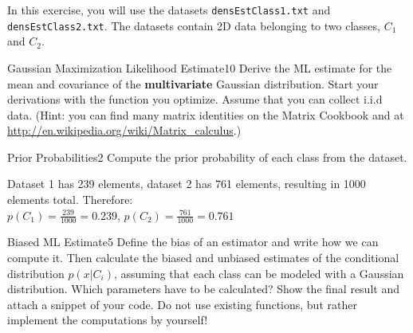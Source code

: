 \newif\ifvimbug
\vimbugfalse

\ifvimbug

\fi

In this exercise, you will use the datasets \texttt{densEstClass1.txt} 
and \texttt{densEstClass2.txt}. The datasets contain 2D data belonging
to two classes, $C_1$ and $C_2$.

\begin{questions}


\begin{question}{Gaussian Maximization Likelihood Estimate}{10}
Derive the ML estimate for the mean and covariance of the \textbf{multivariate} Gaussian distribution. Start your derivations with the function you optimize. Assume that you can collect i.i.d data. (Hint: you can find many matrix identities on the Matrix Cookbook and at \url{http://en.wikipedia.org/wiki/Matrix_calculus}.)

\begin{answer}

\end{answer}

\end{question}



\begin{question}{Prior Probabilities}{2}
Compute the prior probability of each class from the dataset. 

\begin{answer}
Dataset 1 has 239 elements, dataset 2 has 761 elements, resulting in 1000 elements total. Therefore:\\
$p(C_1) = \frac{239}{1000}=0.239$, $p(C_2) = \frac{761}{1000}=0.761$
\end{answer}

\end{question}



\begin{question}{Biased ML Estimate}{5}
Define the bias of an estimator and write how we can compute it.
Then calculate the biased and unbiased estimates of the conditional distribution $p(x|C_i)$, assuming that each class can be modeled with a Gaussian distribution. Which parameters have to be calculated?
Show the final result and attach a snippet of your code.
Do not use existing functions, but rather implement the computations by yourself!


\end{question}
\end{questions}
